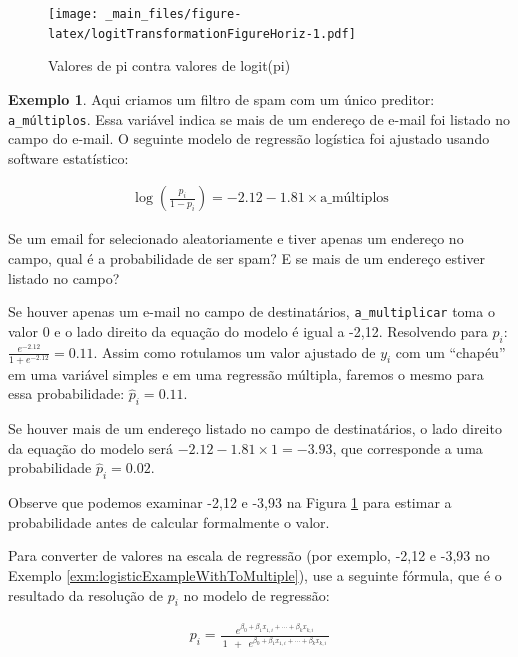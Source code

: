 \documentclass[
]{book}
\theoremstyle{definition}
\theoremstyle{definition}
\newtheorem{example}{Exemplo}[chapter]
\theoremstyle{definition}
\theoremstyle{definition}
\theoremstyle{remark}
\begin{document}
\begin{figure}
\centering
\texttt{[image: \_main\_files/figure-latex/logitTransformationFigureHoriz-1.pdf]}
\caption{\label{fig:logitTransformationFigureHoriz}Valores de pi contra valores de logit(pi)}
\end{figure}

\begin{example}
\protect\hypertarget{exm:logisticExampleWithToMultiple}{}{\label{exm:logisticExampleWithToMultiple} }Aqui criamos um filtro de spam com um único preditor: \texttt{a\_múltiplos}. Essa variável indica se mais de um endereço de e-mail foi listado no campo do e-mail. O seguinte modelo de regressão logística foi ajustado usando software estatístico:
\end{example}

\begin{align*}
\log\left( \frac{p_i}{1-p_i} \right) = -2.12 - 1.81\times\text{a\_múltiplos}
\end{align*}

Se um email for selecionado aleatoriamente e tiver apenas um endereço no campo, qual é a probabilidade de ser spam? E se mais de um endereço estiver listado no campo?

Se houver apenas um e-mail no campo de destinatários, \texttt{a\_multiplicar} toma o valor 0 e o lado direito da equação do modelo é igual a -2,12. Resolvendo para \(p_i\): \(\frac{e^{-2.12}}{1 + e^{-2.12}} = 0.11\). Assim como rotulamos um valor ajustado de \(y_i\) com um ``chapéu'' em uma variável simples e em uma regressão múltipla, faremos o mesmo para essa probabilidade: \(\hat{p}_i = 0.11\).

Se houver mais de um endereço listado no campo de destinatários, o lado direito da equação do modelo será \(-2.12 - 1.81\times1 = -3.93\), que corresponde a uma probabilidade \(\hat{p}_i = 0.02\).

Observe que podemos examinar -2,12 e -3,93 na Figura \ref{fig:logitTransformationFigureHoriz} para estimar a probabilidade antes de calcular formalmente o valor.

Para converter de valores na escala de regressão (por exemplo, -2,12 e -3,93 no Exemplo \ref{exm:logisticExampleWithToMultiple}), use a seguinte fórmula, que é o resultado da resolução de \(p_i\) no modelo de regressão:

\begin{align*}
p_i
    = \frac{e^{\beta_0 + \beta_1 x_{1,i}+\cdots+\beta_k x_{k,i}}}
        {\ 1\ \ +\ \ e^{\beta_0 + \beta_1 x_{1,i}+\cdots+\beta_k x_{k,i}}\ }
\end{align*}
\end{document}
